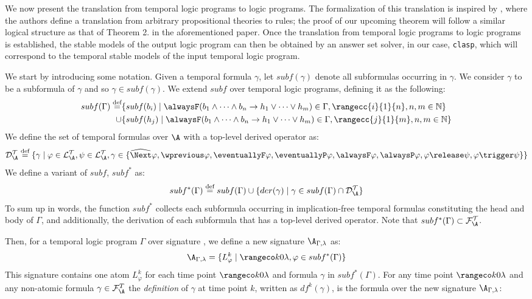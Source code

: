 We now present the translation from temporal logic programs to logic
programs. The formalization of this translation is inspired by
\cite[p. 9]{capeva05a}, where the authors define a translation from
arbitrary propositional theories to rules; the proof of our upcoming
theorem will follow a similar logical structure as that of Theorem
2. in the aforementioned paper. Once the translation from temporal
logic programs to logic programs is established, the stable models of
the output logic program can then be obtained by an answer set solver,
in our case, \verb|clasp|, which will correspond to the temporal
stable models of the input temporal logic program.

We start by introducing some notation.  Given a temporal formula
$\gamma$, let $subf(\gamma)$ denote all subformulas occurring in
$\gamma$. We consider $\gamma$ to be a subformula of $\gamma$ and so
$\gamma \in subf(\gamma)$. We extend $subf$ over temporal logic
programs, defining it as the following:
\begin{align*}
subf(\Gamma) \defeq &\{ subf(b_i) \mid \temprulelong \in \Gamma, \rangecc{i}{1}{n}, n,m \in \mathbb{N} \}\\
  \cup &\{ subf(h_j) \mid \temprulelong \in \Gamma,\rangecc{j}{1}{m}, n,m \in \mathbb{N} \}
\end{align*}
We define the set of temporal formulas over $\A$ with a top-level
derived operator as:
$$
\langdat \defeq \{ \gamma \mid \varphi \in
\langat, \psi \in \langat, 
\gamma \in \{ \wnext\varphi, \wprevious\varphi, \eventuallyF\varphi,
              \eventuallyP\varphi, \alwaysF\varphi, \alwaysP\varphi, \varphi
              \release \psi, \varphi \trigger \psi \} \}
$$
We define a variant of $subf$, $subf^*$ as:
$$
subf^*(\Gamma) \defeq subf(\Gamma) \cup \{ der(\gamma) \mid \gamma \in subf(\Gamma) \cap \langdat \}\\
$$
To sum up in words, the function $subf^*$ collects each subformula
occurring in implication-free temporal formulas constituting the head
and body of $\Gamma$, and additionally, the derivation of each
subformula that has a top-level derived operator. Note that
$subf^*(\Gamma) \subset \langfat$.

Then, for a temporal logic program $\Gamma$ over signature \A, we define a
new signature $\A_{\Gamma,\lambda}$ as:
$$
\A_{\Gamma,\lambda} = \{ L_{\varphi}^k \mid \kinlambda, \varphi \in subf^*(\Gamma) \}
$$
This signature contains one atom $L_\varphi^k$ for each time point
$\kinlambda$ and formula $\gamma$ in $subf^*(\Gamma)$. For any time
point $\kinlambda$ and any non-atomic formula
$\gamma \in \mathcal{F}_\A^T$ the \emph{definition} of $\gamma$ at
time point $k$, written as $df^k(\gamma)$, is the formula over the new
signature $\A_{\Gamma,\lambda}$:

